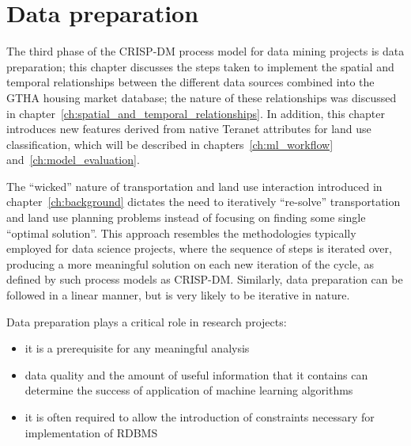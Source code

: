 \chapter{Data preparation} \label{ch:data_preparation}

The third phase of the CRISP-DM process model for data mining projects is data preparation;
this chapter discusses the steps taken to implement the spatial and temporal relationships between the different data sources combined into the GTHA housing market database;
the nature of these relationships was discussed in chapter~\ref{ch:spatial_and_temporal_relationships}.
In addition, this chapter introduces new features derived from native Teranet attributes for land use classification, which will be described in chapters~\ref{ch:ml_workflow} and~\ref{ch:model_evaluation}.

The ``wicked'' nature of transportation and land use interaction introduced in chapter~\ref{ch:background} dictates the need to iteratively ``re-solve'' transportation and land use planning problems instead of focusing on finding some single ``optimal solution''.
This approach resembles the methodologies typically employed for data science projects, where the sequence of steps is iterated over, producing a more meaningful solution on each new iteration of the cycle, as defined by such process models as CRISP-DM\cite{Shearer2000}.
Similarly, data preparation can be followed in a linear manner, but is very likely to be iterative in nature\cite{Brownlee2013}.

\vspace{5mm}

Data preparation plays a critical role in research projects:

\begin{itemize}
    \item it is a prerequisite for any meaningful analysis
    \item data quality and the amount of useful information that it contains can determine the success of application of machine learning algorithms\cite{RaschkaMirjalili2017}
    \item it is often required to allow the introduction of constraints necessary for implementation of RDBMS
\end{itemize}

\vspace{5mm}

